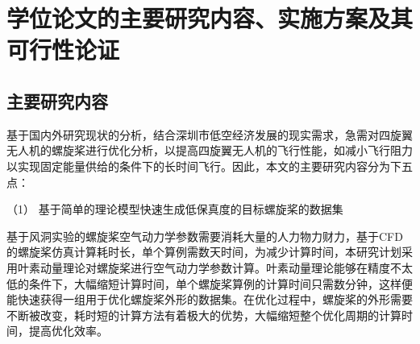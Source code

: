 




\vspace{0.8em}
\section{学位论文的主要研究内容、实施方案及其可行性论证}\label{Sec: content and plan}
\vspace{0.8em}

\vspace{0.8em}
\subsection{主要研究内容}\label{content}
\vspace{0.8em}

基于国内外研究现状的分析，结合深圳市低空经济发展的现实需求，急需对四旋翼无人机的螺旋桨进行优化分析，以提高四旋翼无人机的飞行性能，如减小飞行阻力以实现固定能量供给的条件下的长时间飞行。因此，本文的主要研究内容分为下五点：

（1） 基于简单的理论模型快速生成低保真度的目标螺旋桨的数据集

基于风洞实验的螺旋桨空气动力学参数需要消耗大量的人力物力财力，基于CFD的螺旋桨仿真计算耗时长，单个算例需数天时间，为减少计算时间，本研究计划采用叶素动量理论对螺旋桨进行空气动力学参数计算。叶素动量理论能够在精度不太低的条件下，大幅缩短计算时间，单个螺旋桨算例的计算时间只需数分钟，这样便能快速获得一组用于优化螺旋桨外形的数据集。在优化过程中，螺旋桨的外形需要不断被改变，耗时短的计算方法有着极大的优势，大幅缩短整个优化周期的计算时间，提高优化效率。

